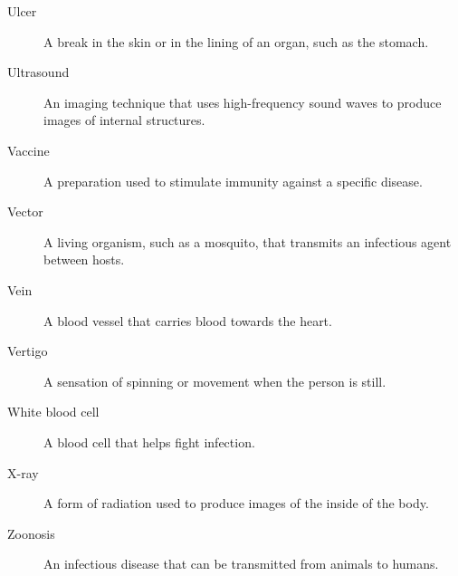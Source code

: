 \documentclass[12pt,oneside]{book}
\begin{document}
\begin{description}
  \item[Ulcer] A break in the skin or in the lining of an organ, such as the stomach.
  \item[Ultrasound] An imaging technique that uses high-frequency sound waves to produce images of internal structures.
  \item[Vaccine] A preparation used to stimulate immunity against a specific disease.
  \item[Vector] A living organism, such as a mosquito, that transmits an infectious agent between hosts.
  \item[Vein] A blood vessel that carries blood towards the heart.
  \item[Vertigo] A sensation of spinning or movement when the person is still.
  \item[White blood cell] A blood cell that helps fight infection.
  \item[X-ray] A form of radiation used to produce images of the inside of the body.
  \item[Zoonosis] An infectious disease that can be transmitted from animals to humans.
\end{description}



\clearpage
{}
\printindex

\backmatter
\end{document}
